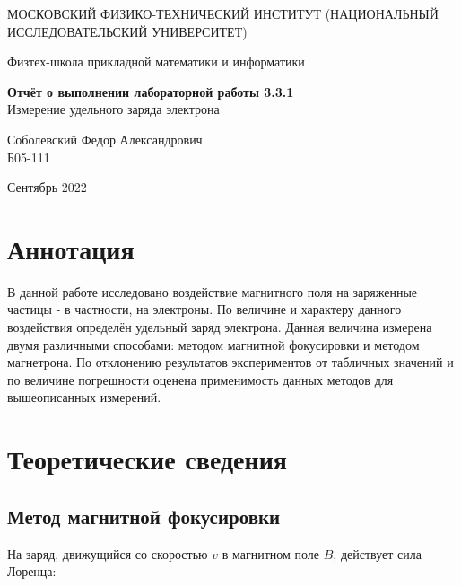 \documentclass[a4paper,12pt]{article} %
\date{\today}
\begin{document}
\begin{titlepage}
	\begin{center}
		{\large МОСКОВСКИЙ ФИЗИКО-ТЕХНИЧЕСКИЙ ИНСТИТУТ (НАЦИОНАЛЬНЫЙ ИССЛЕДОВАТЕЛЬСКИЙ УНИВЕРСИТЕТ)}
	\end{center}
	\begin{center}
		{\large Физтех-школа прикладной математики и информатики}
	\end{center}
	
	
	\vspace{4.5cm}
	{\huge
		\begin{center}
			{\bf Отчёт о выполнении лабораторной работы 3.3.1}\\
			Измерение удельного заряда электрона
		\end{center}
	}
	\vspace{1cm}
	\begin{center}
		{\large Соболевский Федор Александрович \\
			\vspace{0.2cm}
			Б05-111}
	\end{center}
	\vspace{8cm}
	\begin{center}
		Сентябрь 2022
	\end{center}
\end{titlepage}

\section{Аннотация}

В данной работе исследовано воздействие магнитного поля на заряженные частицы - в частности, на электроны. По величине и характеру данного воздействия определён удельный заряд электрона. Данная величина измерена двумя различными способами: методом магнитной фокусировки и методом магнетрона. По отклонению результатов экспериментов от табличных значений и по величине погрешности оценена применимость данных методов для вышеописанных измерений.

\section{Теоретические сведения}

\subsection{Метод магнитной фокусировки}

На заряд, движущийся со скоростью $v$ в магнитном поле $B$, действует сила Лоренца:
\end{document}
